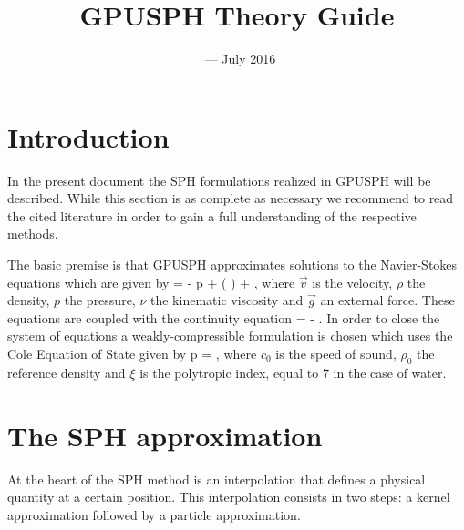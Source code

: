 \documentclass{../GPUSPHtemplate}
\title{GPUSPH Theory Guide}
\author{}
\date{\currentver\ --- July 2016}
\begin{document}
\maketitle
\tableofcontents
\clearpage
\section{Introduction}

In the present document the SPH formulations realized in GPUSPH will be
described. While this section is as complete as necessary we recommend
to read the cited literature in order to gain a full understanding of
the respective methods.

The basic premise is that GPUSPH approximates solutions to the
Navier-Stokes equations which are given by
\be
{} = -\vec{\nabla} p + \nabla \cdot (\nu
\vec{\nabla} \otimes {}) + ,
\label{e:sph:ns}
\en
where $\vec{v}$ is the velocity, $\rho$ the density, $p$ the
pressure, $\nu$ the kinematic viscosity and $\vec{g}$ an external
force. These equations are coupled with the continuity equation
\be
{} = - \rho \nabla \cdot {}.
\label{e:sph:cont}
\en
In order to close the system of equations a weakly-compressible
formulation is chosen which uses the Cole Equation of State given by
\be
p = ,
\label{e:sph:eos}
\en
where $c_0$ is the speed of sound, $\rho_0$ the reference density and
$\xi$ is the polytropic index, equal to 7 in the case of water.

\section{The SPH approximation}

At the heart of the SPH method is an interpolation that defines a
physical quantity at a certain position. This interpolation consists
in two steps: a kernel approximation followed by a particle approximation.
\end{document}
